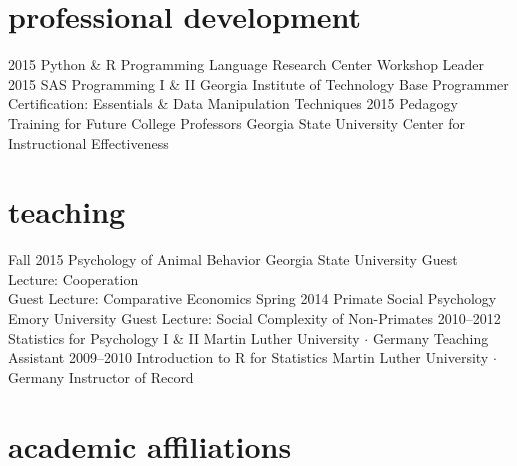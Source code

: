 \documentclass[]{friggeri-cv}
\begin{document}
\newpage
\thispagestyle{fancy}

\section{professional development}

\begin{entrylist}
  \entry
    {2015}
    {Python \& R Programming}
    {Language Research Center}
    {Workshop Leader} %
  \entry
    {2015}
    {SAS Programming I \& II}
    {Georgia Institute of Technology}
    {Base Programmer Certification: Essentials \& Data Manipulation Techniques}
  \entry
    {2015}
    {Pedagogy Training for Future College Professors}
    {Georgia State University}
    {Center for Instructional Effectiveness}
\end{entrylist}


\section{teaching}

\begin{entrylist}
  \entry
    {Fall 2015}
    {Psychology of Animal Behavior}
    {Georgia State University}
    {Guest Lecture: Cooperation\\
    Guest Lecture: Comparative Economics}
  \entry
    {Spring 2014}
    {Primate Social Psychology}
    {Emory University}
    {Guest Lecture: Social Complexity of Non-Primates}
  \entry
    {2010--2012}
    {Statistics for Psychology I \& II}
    {Martin Luther University $\cdot$ Germany}
    {Teaching Assistant}
  \entry
    {2009--2010}
    {Introduction to R for Statistics}
    {Martin Luther University $\cdot$ Germany}
    {Instructor of Record}
\end{entrylist}


\section{academic affiliations}
\end{document}
